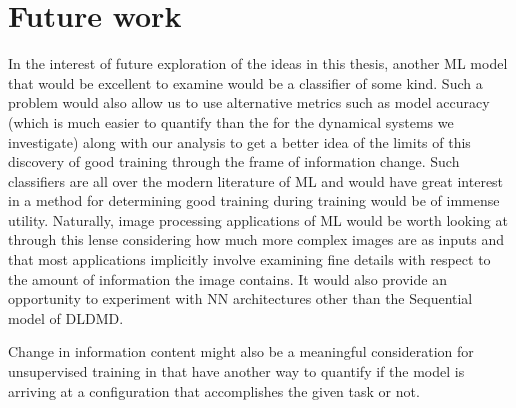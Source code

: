 \section{Future work}
In the interest of future exploration of the ideas in this thesis, another ML model that would be 
excellent to examine would be a classifier of some kind. Such a problem would also allow us to use 
alternative metrics such as model accuracy (which is much easier to quantify than the for the dynamical 
systems we investigate) along with our analysis to get a better idea of the limits of this discovery of 
good training through the frame of information change. Such classifiers are all over the modern literature 
of ML and would have great interest in a method for determining good training during training would be of 
immense utility. Naturally, image processing applications of ML would be worth looking at through this 
lense considering how much more complex images are as inputs and that most applications implicitly
involve examining fine details with respect to the amount of information the image contains. It would
also provide an opportunity to experiment with NN architectures other than the Sequential model 
of DLDMD. 

Change in information content might also be a meaningful consideration for unsupervised training in 
that have another way to quantify if the model is arriving at a configuration that accomplishes the 
given task or not. 